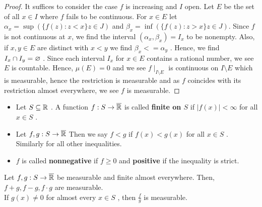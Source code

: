\begin{proof}
	It suffices to consider the case \(f\)  is increasing and \(I\) open. Let \(E\)  be the set of all \(x \in I\)  where \(f\)  fails to be continuous. For \(x \in E\)  let \(\alpha_{x} = \sup ( \{f\left( z \right)  : z < x \} z \in J )\) and \(\beta_{x} = \inf (\{f\left( z \right)  : z > x \} z \in J) \). Since \(f\)  is not continuous at \(x\), we find the interval \(\left( \alpha_{x}, \beta_{x} \right) = I_{x} \)  to be nonempty. Also, if \(x, y \in E\)  are distinct with \(x < y\)  we find \(\beta_{x} <= \alpha_{y}\) . Hence, we find \(I_{x} \cap I_{y} = \varnothing\) . Since each interval \(I_{x}\)  for \(x \in E\) contains a rational number, we see \(E\)  is countable. Hence, \( \mu\left( E \right) = 0\) and we see \( f\mid_{I \setminus E}\) is continuous on \(I \setminus E\) which is measurable, hence the restriction is measurable and as \(f\)  coincides with its restriction almost everywhere, we see \(f\)  is measurable.
\end{proof}
\begin{definition}
\begin{itemize}
	\item Let \(S \subseteq \mathbb{R}\) . A function \(f: S \to \overline{\mathbb{R}}\)  is called \textbf{finite on \(S\) } if \(\left| f\left( x \right)  \right| < \infty\)  for all \(x \in S\) .
	\item Let \(f, g: S \to \overline{\mathbb{R}}\)  Then we say \(f < g\)  if \(f\left( x \right) < g\left( x \right) \) for all \(x \in S\) . Similarly for all other inequalities.
	\item \(f\)  is called \textbf{nonnegative} if \(f \ge 0\) and \textbf{positive} if the inequality is strict.
\end{itemize}
\end{definition}
\begin{proposition}
	Let \(f, g: S \to \overline{\mathbb{R}}\)  be measurable and finite almost everywhere. Then, \(f + g, f - g, f \cdot g\)  are measurable.\\
	If \(g \left( x \right) \neq 0\)  for almost every \(x \in S\) , then \(\frac{f}{g}\)  is measurable.
\end{proposition}
